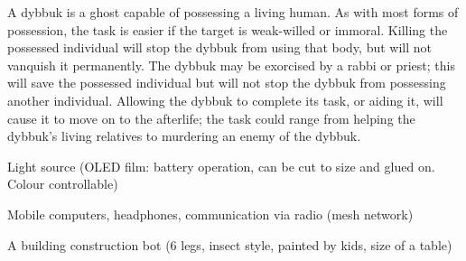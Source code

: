 \begin{npcBox}[title=Dybbuk]
\begin{stunts}
\item {}
\end{stunts}

\begin{stressSection}
\end{stressSection}
\begin{tabularx}{\textwidth}{ XX }
\end{tabularx}

\begin{consequences}
\item {}
\item {}
\item {}
\end{consequences}


\begin{npcDescription}
A dybbuk is a ghost capable of possessing a living human. As with most forms of possession, the task is easier if the target is weak-willed or immoral. Killing the possessed individual will stop the dybbuk from using that body, but will not vanquish it permanently. The dybbuk may be exorcised by a rabbi or priest; this will save the possessed individual but will not stop the dybbuk from possessing another individual. Allowing the dybbuk to complete its task, or aiding it, will cause it to move on to the afterlife; the task could range from helping the dybbuk’s living relatives to murdering an enemy of the dybbuk.
\end{npcDescription}

\begin{equipment}
    \item Light source (OLED film: battery operation, can be cut to size and glued on. Colour controllable)
    \item Mobile computers, headphones, communication via radio (mesh network)
    \item A building construction bot (6 legs, insect style, painted by kids, size of a table)
\end{equipment}

\end{npcBox}
